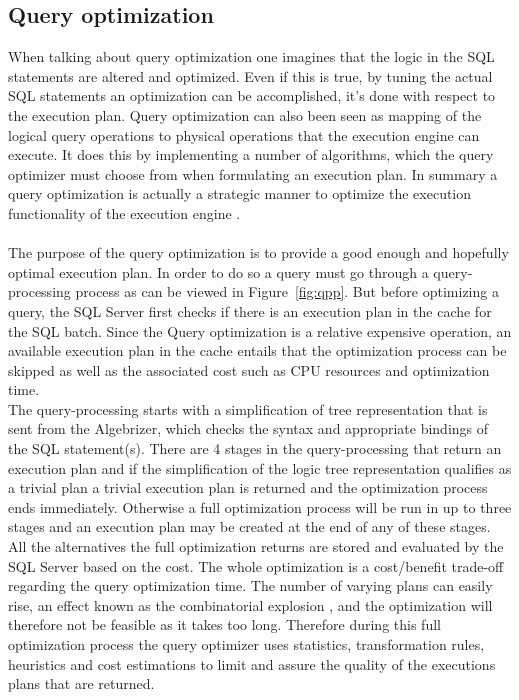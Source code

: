 \documentclass{cslthse-msc}
\begin{document}
\subsection{Query optimization}\label{sec:qopt}
When talking about query optimization one imagines that the logic in the SQL statements are altered and optimized. Even if this is true, by tuning the actual SQL statements an optimization can be accomplished, it's done with respect to the execution plan. Query optimization can also been seen as mapping of the logical query operations to physical operations that the execution engine can execute. It does this by implementing a number of algorithms, which the query optimizer must choose from when formulating an execution plan. In summary a query optimization is actually a strategic manner to optimize the execution functionality of the execution engine   \cite{Nevarez}. \\\\ 
The purpose of the query optimization is to provide a good enough and hopefully optimal execution plan. In order to do so a query must go through a query-processing process as can be viewed in Figure~\ref{fig:qpp}. But before optimizing a query, the SQL Server first checks if there is an execution plan in the cache for the SQL batch. Since the Query optimization is a relative expensive operation, an available execution plan in the cache entails that the optimization process can be skipped as well as the associated cost such as CPU resources and optimization time.\\ The query-processing starts with a simplification of tree representation that is sent from the Algebrizer, which checks the syntax and appropriate bindings of the SQL statement(s). There are 4 stages in the query-processing that return an execution plan and if the simplification of the logic tree representation qualifies as a trivial plan a trivial execution plan is returned and the optimization process ends immediately. Otherwise a full optimization process will be run in up to three stages and an execution plan may be created at the end of any of these stages. All the alternatives the full optimization returns are stored and evaluated by the SQL Server based on the cost. The whole optimization is a cost/benefit trade-off regarding the query optimization time. The number of varying plans can easily rise, an effect known as the combinatorial explosion   \cite{combo}, and the optimization will therefore not be feasible as it takes too long. Therefore during this full optimization process the query optimizer uses statistics, transformation rules, heuristics and cost estimations to limit and assure the quality of the executions plans that are returned.\\\\ 
\end{document}
